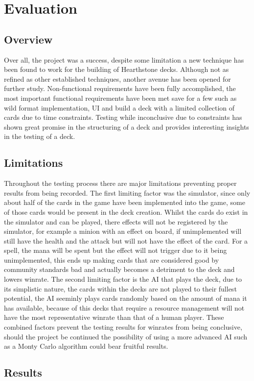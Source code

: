 \documentclass{report} %
\begin{document}
\chapter{Evaluation}
\section{Overview}
Over all, the project was a success, despite some limitation a new technique has been found to work for the building of Hearthstone decks. Although not as refined as other established techniques, another avenue has been opened for further study. Non-functional requirements have been fully accomplished, the most important functional requirements have been met save for a few such as wild format implementation, UI and build a deck with a limited collection of cards due to time constraints. Testing while inconclusive due to constraints has shown great promise in the structuring of a deck and provides interesting insights in the testing of a deck.
\section{Limitations}
Throughout the testing process there are major limitations preventing proper results from being recorded. The first limiting factor was the simulator, since only about half of the cards in the game have been implemented into the game, some of those cards would be present in the deck creation. Whilst the cards do exist in the simulator and can be played, there effects will not be registered by the simulator, for example a minion with an effect on board, if unimplemented will still have the health and the attack but will not have the effect of the card. For a spell, the mana will be spent but the effect will not trigger due to it being unimplemented, this ends up making cards that are considered good by community standards bad and actually becomes a detriment to the deck and lowers winrate. The second limiting factor is the AI that plays the deck, due to its simplistic nature, the cards within the decks are not played to their fullest potential, the AI seeminly plays cards randomly based on the amount of mana it has available, because of this decks that require a resource management will not have the most representative winrate than that of a human player. These combined factors prevent the testing results for winrates from being conclusive, should the project be continued the possibility of using a more advanced AI such as a Monty Carlo algorithm could bear fruitful results.
\section{Results}
\end{document}
